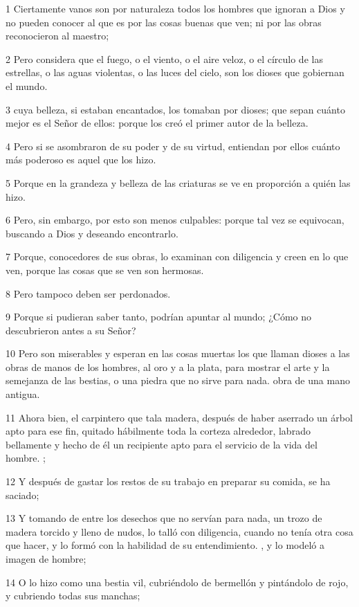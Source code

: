 \par 1 Ciertamente vanos son por naturaleza todos los hombres que ignoran a Dios y no pueden conocer al que es por las cosas buenas que ven; ni por las obras reconocieron al maestro;
\par 2 Pero considera que el fuego, o el viento, o el aire veloz, o el círculo de las estrellas, o las aguas violentas, o las luces del cielo, son los dioses que gobiernan el mundo.
\par 3 cuya belleza, si estaban encantados, los tomaban por dioses; que sepan cuánto mejor es el Señor de ellos: porque los creó el primer autor de la belleza.
\par 4 Pero si se asombraron de su poder y de su virtud, entiendan por ellos cuánto más poderoso es aquel que los hizo.
\par 5 Porque en la grandeza y belleza de las criaturas se ve en proporción a quién las hizo.
\par 6 Pero, sin embargo, por esto son menos culpables: porque tal vez se equivocan, buscando a Dios y deseando encontrarlo.
\par 7 Porque, conocedores de sus obras, lo examinan con diligencia y creen en lo que ven, porque las cosas que se ven son hermosas.
\par 8 Pero tampoco deben ser perdonados.
\par 9 Porque si pudieran saber tanto, podrían apuntar al mundo; ¿Cómo no descubrieron antes a su Señor?
\par 10 Pero son miserables y esperan en las cosas muertas los que llaman dioses a las obras de manos de los hombres, al oro y a la plata, para mostrar el arte y la semejanza de las bestias, o una piedra que no sirve para nada. obra de una mano antigua.
\par 11 Ahora bien, el carpintero que tala madera, después de haber aserrado un árbol apto para ese fin, quitado hábilmente toda la corteza alrededor, labrado bellamente y hecho de él un recipiente apto para el servicio de la vida del hombre. ;
\par 12 Y después de gastar los restos de su trabajo en preparar su comida, se ha saciado;
\par 13 Y tomando de entre los desechos que no servían para nada, un trozo de madera torcido y lleno de nudos, lo talló con diligencia, cuando no tenía otra cosa que hacer, y lo formó con la habilidad de su entendimiento. , y lo modeló a imagen de hombre;
\par 14 O lo hizo como una bestia vil, cubriéndolo de bermellón y pintándolo de rojo, y cubriendo todas sus manchas;
